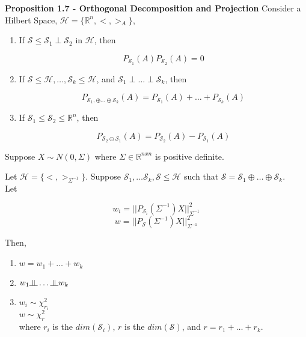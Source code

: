 \documentclass[11pt,fleqn]{book} %
\newcommand{\indep}{\rotatebox[origin=c]{90}{$\models$}}
\begin{document}
\textbf{Proposition 1.7 - Orthogonal Decomposition and Projection} Consider a Hilbert Space, $\mathscr{H} = \{\mathbb{R}^n, <,>_A \}$, 

\begin{enumerate}
	\item If $\mathscr{S} \leq \mathscr{S}_1 \perp \mathscr{S}_2$ in $\mathscr{H}$, then 

	$$P_{\mathscr{S}_1} (A) P_{\mathscr{S}_2} (A) = 0  $$

	\item If $\mathscr{S} \leq \mathscr{H}, \dots, \mathscr{S}_k \leq \mathscr{H}$, and $\mathscr{S}_1 \perp \dots \perp \mathscr{S}_k$, then

	$$P_{\mathscr{S}_1, \oplus \dots \oplus \mathscr{S}_k} (A) = P_{\mathscr{S}_1} (A) + \dots + P_{\mathscr{S}_k} (A) $$

	\item If $\mathscr{S}_1 \leq \mathscr{S}_2 \leq \mathbb{R}^n$, then

	$$P_{\mathscr{S}_2 \ominus \mathscr{S}_1} (A) = P_{\mathscr{S}_2} (A) - P_{\mathscr{S}_1} (A)$$
\end{enumerate}


\begin{theorem}

Suppose $X \sim N(0, \Sigma)$ where $\Sigma \in \mathbb{R}^{nxn}$ is positive definite. 

Let $\mathscr{H} = \{ <,>_{\Sigma^{-1}}\}$. Suppose $\mathscr{S}_1, \dots \mathscr{S}_k, \mathscr{S} \leq \mathscr{H}$ such that $\mathscr{S} = \mathscr{S}_1 \oplus \dots \oplus \mathscr{S}_k$.\\

Let 

	$$w_i = ||P_{\mathscr{S}_i} (\Sigma^{-1}) X ||^2_{\Sigma^{-1}} $$
	$$w = ||P_{\mathscr{S}} (\Sigma^{-1}) X ||^2_{\Sigma^{-1}} $$

Then, 

\begin{enumerate}
	\item $ w = w_1 + \dots + w_k$
	\item $ w_1 \indep \dots \indep w_k$
	\item $w_i \sim \chi^2_{r_i}$\\
		$w \sim \chi^2_{r}$\\
		where $r_i$ is the $dim(\mathscr{S}_i)$, $r$ is the $dim(\mathscr{S})$, and $r = r_1 + \dots + r_k$.
\end{enumerate}
	
\end{theorem}
\end{document}
